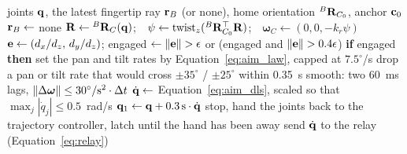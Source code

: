 \begin{algorithm}[htbp]
\caption{Finger-pointing camera aim, one control cycle (125~Hz)}
\label{alg:aim}
\begin{algorithmic}[1]
\REQUIRE joints $\mathbf{q}$, the latest fingertip ray $\mathbf{r}_B$ (or none), home orientation ${}^{B}\mathbf{R}_{C_0}$, anchor $\mathbf{c}_0$
  \STATE $\mathbf{r}_B\gets$ none 
\ENDIF
\STATE $\mathbf{R}\gets{}^{B}\mathbf{R}_{C}(\mathbf{q})$;\ \ $\psi\gets\operatorname{twist}_z({}^{B}\mathbf{R}_{C_0}^{\top}\mathbf{R})$;\ \ $\boldsymbol{\omega}_C\gets(0,0,-k_r\psi)$
  \STATE $\mathbf{e}\gets(d_x/d_z,\,d_y/d_z)$; engaged $\gets\left\lVert\mathbf{e}\right\rVert>\epsilon$ or (engaged and $\left\lVert\mathbf{e}\right\rVert>0.4\epsilon$)
  \STATE \textbf{if} engaged \textbf{then} set the pan and tilt rates by Equation~\ref{eq:aim_law}, capped at $7.5^\circ$/s
\ENDIF
\STATE drop a pan or tilt rate that would cross $\pm35^\circ$ / $\pm25^\circ$ within 0.35~s
\STATE smooth: two 60~ms lags, $\left\lVert\Delta\boldsymbol{\omega}\right\rVert\le30^\circ/\mathrm{s}^2\cdot\Delta t$
\STATE $\dot{\mathbf{q}}\gets$ Equation~\ref{eq:aim_dls}, scaled so that $\max_j|\dot q_j|\le0.5$~rad/s
\STATE $\mathbf{q}_1\gets\mathbf{q}+0.3\,\mathrm{s}\cdot\dot{\mathbf{q}}$
  \STATE stop, hand the joints back to the trajectory controller, latch until the hand has been away
\ELSE
  \STATE send $\dot{\mathbf{q}}$ to the relay (Equation~\ref{eq:relay})
\ENDIF
\end{algorithmic}
\end{algorithm}

